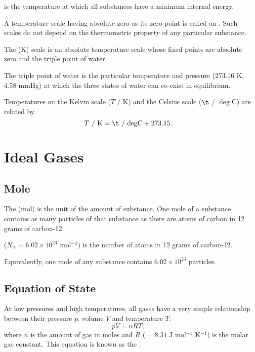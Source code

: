 \begin{definition}
     is the temperature at which all substances have a minimum internal energy.
\end{definition}

A temperature scale having absolute zero as its zero point is called an . Such scales do not depend on the thermometric property of any particular substance.

\begin{definition}
    The  (K) scale is an absolute temperature scale whose fixed points are absolute zero and the triple point of water.
\end{definition}

The triple point of water is the particular temperature and pressure (273.16 K, 4.58 mmHg) at which the three states of water can co-exist in equilibrium.

Temperatures on the Kelvin scale ($T$ / K) and the Celsius scale ($\t$ / $\deg$C) are related by \[\text{$T$ / K} = \text{$\t$ / $\deg$C} + 273.15.\]

\section{Ideal Gases}

\subsection{Mole}

\begin{definition}
    The  (mol) is the unit of the amount of substance. One mole of a substance contains as many particles of that substance as there are atoms of carbon in 12 grams of carbon-12.
\end{definition}

\begin{definition}
     ($N_A = 6.02 \times 10^{23}$ mol$^{-1}$) is the number of atoms in 12 grams of carbon-12.
\end{definition}

Equivalently, one mole of any substance contains $6.02 \times 10^{23}$ particles.

\subsection{Equation of State}

At low pressures and high temperatures, all gases have a very simple relationship between their pressure $p$, volume $V$ and temperature $T$: \[pV = nRT,\] where $n$ is the amount of gas in moles and $R$ ($= 8.31$ J mol$^{-1}$ K$^{-1}$) is the molar gas constant. This equation is known as the .

